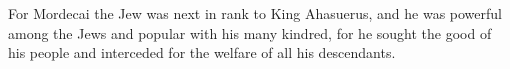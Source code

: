 \begin{versebox}
					\item[NRSV] For Mordecai the Jew was next in rank to King Ahasuerus, and he was powerful among the Jews and popular with his many kindred, for he sought the good of his people and interceded for the welfare of all his descendants.
			\end{versebox}
